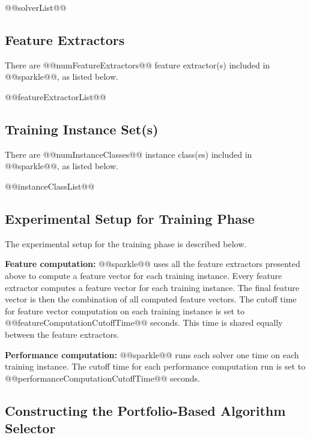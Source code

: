 \documentclass[british]{article}
\begin{document}
\begin{enumerate} 
@@solverList@@
\end{enumerate}

\subsection{Feature Extractors}
\label{sec:Feature_Extractors}
There are @@numFeatureExtractors@@ feature extractor(s) included in @@sparkle@@, as listed below.

\begin{enumerate}
@@featureExtractorList@@
\end{enumerate}

\subsection{Training Instance Set(s)}
\label{sec:Train_Instance_Classes}
There are @@numInstanceClasses@@ instance class(es) included in @@sparkle@@, as listed below.

\begin{enumerate}
@@instanceClassList@@
\end{enumerate}

\subsection{Experimental Setup for Training Phase}
\label{sec:Experimental_Setup_for_Training_Phase}

The experimental setup for the training phase is described below.

\textbf{Feature computation:} @@sparkle@@ uses all the feature extractors presented above to compute a feature vector for each training instance. Every feature extractor computes a feature vector for each training instance. The final feature vector is then the combination of all computed feature vectors. The cutoff time for feature vector computation on each training instance is set to @@featureComputationCutoffTime@@ seconds. This time is shared equally between the feature extractors.

\textbf{Performance computation:} @@sparkle@@ runs each solver one time on each training instance. The cutoff time for each performance computation run is set to @@performanceComputationCutoffTime@@ seconds.

\subsection{Constructing the Portfolio-Based Algorithm Selector}
\label{sec:Portfolio}
\end{document}
